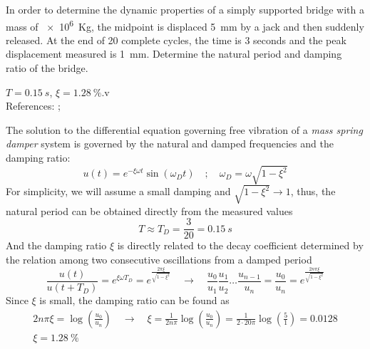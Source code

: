 
\begin{Exercise}[label={free_vibration}]
In order to determine the dynamic properties of a simply supported bridge with a mass of \qty{e6}{Kg}, the midpoint is displaced \qty{5}{mm} by a jack and then suddenly released. At the end of 20 complete cycles, the time is 3 seconds and the peak displacement measured is \qty{1}{mm}. Determine the natural period and damping ratio of the bridge.

\begin{center}
\end{center}

\shortAnswer $T=\SI{0.15}{s}$, $\xi=\SI{1.28}{\%}$.v \\
References: \cite[page 49]{chopra}; \cite[page 287]{blanco}
\end{Exercise}



\begin{Answer}[ref={free_vibration}]
The solution to the differential equation governing free vibration of a \emph{mass spring damper} system is governed by the natural and damped frequencies and the damping ratio:
$$
u(t) = e^{-\xi\omega t}\sin(\omega_D t) \quad ; \quad \omega_D = \omega\sqrt{1-\xi^2}
$$
For simplicity, we will assume a small damping and $\sqrt{1-\xi^2}\rightarrow1$, thus, the natural period can be obtained directly from the measured values
$$
T \approx T_D = \frac{3}{20} = \SI{0.15}{s}
$$
And the damping ratio $\xi$ is directly related to the decay coefficient determined by the relation among two consecutive oscillations from a damped period
$$
\frac{u(t)}{u(t+T_D)} = e^{\xi\omega T_D} = e^{\frac{2\pi\xi}{\sqrt{1-\xi^2}}} \quad \rightarrow \quad
\frac{u_0}{u_1} \frac{u_1}{u_2} \dots \frac{u_{n-1}}{u_n} = \frac{u_0}{u_n} = e^{\frac{2n\pi\xi}{\sqrt{1-\xi^2}}}
$$
Since $\xi$ is small, the damping ratio can be found as
\begin{align*}
2n\pi\xi = \log\left(\frac{u_0}{u_n}\right) \quad \rightarrow \quad
\xi = \frac{1}{2n\pi} \log\left(\frac{u_0}{u_n}\right) = \frac{1}{2\cdot20\pi} \log\left(\frac{5}{1}\right) = 0.0128 \\
\xi = \SI{1.28}{\%}
\end{align*}    

\end{Answer}